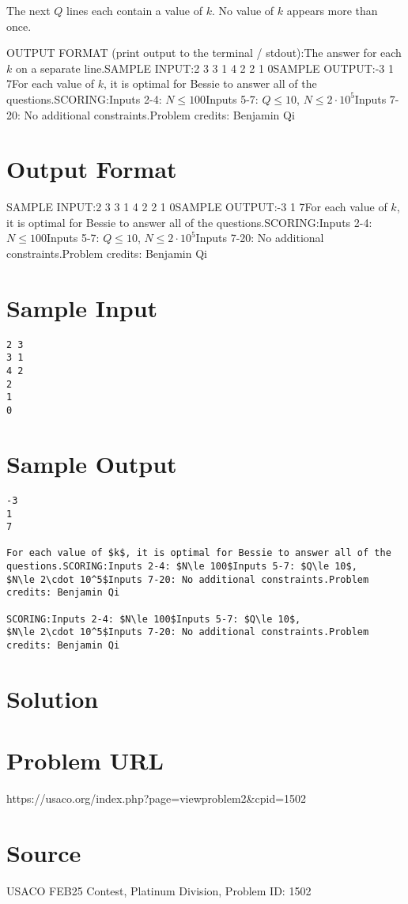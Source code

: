 \documentclass[12pt]{article}
\begin{document}
The next $Q$ lines each contain a value of $k$. No value of $k$ appears more
than once.

OUTPUT FORMAT (print output to the terminal / stdout):The answer for each $k$ on a separate line.SAMPLE INPUT:2 3
3 1
4 2
2
1
0SAMPLE OUTPUT:-3
1
7For each value of $k$, it is optimal for Bessie to answer all of the questions.SCORING:Inputs 2-4: $N\le 100$Inputs 5-7: $Q\le 10$,
$N\le 2\cdot 10^5$Inputs 7-20: No additional constraints.Problem credits: Benjamin Qi

\section*{Output Format}
SAMPLE INPUT:2 3
3 1
4 2
2
1
0SAMPLE OUTPUT:-3
1
7For each value of $k$, it is optimal for Bessie to answer all of the questions.SCORING:Inputs 2-4: $N\le 100$Inputs 5-7: $Q\le 10$,
$N\le 2\cdot 10^5$Inputs 7-20: No additional constraints.Problem credits: Benjamin Qi

\section*{Sample Input}
\begin{verbatim}
2 3
3 1
4 2
2
1
0
\end{verbatim}

\section*{Sample Output}
\begin{verbatim}
-3
1
7

For each value of $k$, it is optimal for Bessie to answer all of the questions.SCORING:Inputs 2-4: $N\le 100$Inputs 5-7: $Q\le 10$,
$N\le 2\cdot 10^5$Inputs 7-20: No additional constraints.Problem credits: Benjamin Qi

SCORING:Inputs 2-4: $N\le 100$Inputs 5-7: $Q\le 10$,
$N\le 2\cdot 10^5$Inputs 7-20: No additional constraints.Problem credits: Benjamin Qi
\end{verbatim}

\section*{Solution}


\section*{Problem URL}
https://usaco.org/index.php?page=viewproblem2&cpid=1502

\section*{Source}
USACO FEB25 Contest, Platinum Division, Problem ID: 1502
\end{document}

